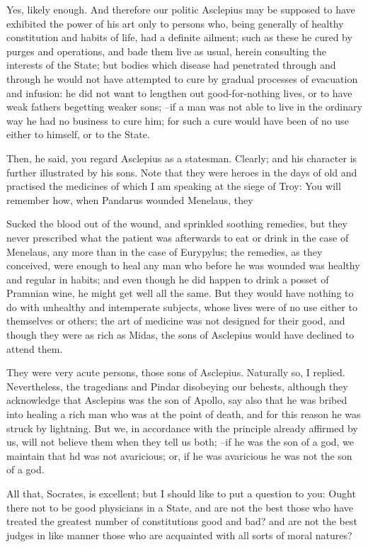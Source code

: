 Yes, likely enough.
And therefore our politic Asclepius may be supposed to have exhibited the power of his art only to persons who, being generally of healthy constitution and habits of life, had a definite ailment; such as these he cured by purges and operations, and bade them live as usual, herein consulting the interests of the State; but bodies which disease had penetrated through and through he would not have attempted to cure by gradual processes of evacuation and infusion: he did not want to lengthen out good-for-nothing lives, or to have weak fathers begetting weaker sons; --if a man was not able to live in the ordinary way he had no business to cure him; for such a cure would have been of no use either to himself, or to the State.

Then, he said, you regard Asclepius as a statesman.
Clearly; and his character is further illustrated by his sons. Note that they were heroes in the days of old and practised the medicines of which I am speaking at the siege of Troy: You will remember how, when Pandarus wounded Menelaus, they

Sucked the blood out of the wound, and sprinkled soothing remedies, but they never prescribed what the patient was afterwards to eat or drink in the case of Menelaus, any more than in the case of Eurypylus; the remedies, as they conceived, were enough to heal any man who before he was wounded was healthy and regular in habits; and even though he did happen to drink a posset of Pramnian wine, he might get well all the same. But they would have nothing to do with unhealthy and intemperate subjects, whose lives were of no use either to themselves or others; the art of medicine was not designed for their good, and though they were as rich as Midas, the sons of Asclepius would have declined to attend them.

They were very acute persons, those sons of Asclepius.
Naturally so, I replied. Nevertheless, the tragedians and Pindar disobeying our behests, although they acknowledge that Asclepius was the son of Apollo, say also that he was bribed into healing a rich man who was at the point of death, and for this reason he was struck by lightning. But we, in accordance with the principle already affirmed by us, will not believe them when they tell us both; --if he was the son of a god, we maintain that hd was not avaricious; or, if he was avaricious he was not the son of a god.

All that, Socrates, is excellent; but I should like to put a question to you: Ought there not to be good physicians in a State, and are not the best those who have treated the greatest number of constitutions good and bad? and are not the best judges in like manner those who are acquainted with all sorts of moral natures?

